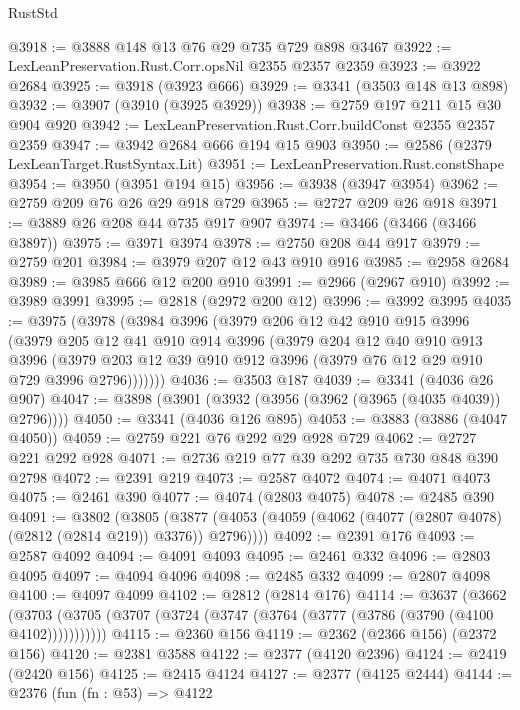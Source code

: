 \begin{lexlean}{RustStd}
\begin{coremodule}
@3918 := @3888 @148 @13 @76 @29 @735 @729 @898 @3467
@3922 := LexLeanPreservation.Rust.Corr.opsNil @2355 @2357 @2359
@3923 := @3922 @2684
@3925 := @3918 (@3923 @666)
@3929 := @3341 (@3503 @148 @13 @898)
@3932 := @3907 (@3910 (@3925 @3929))
@3938 := @2759 @197 @211 @15 @30 @904 @920
@3942 := LexLeanPreservation.Rust.Corr.buildConst @2355 @2357 @2359
@3947 := @3942 @2684 @666 @194 @15 @903
@3950 := @2586 (@2379 LexLeanTarget.RustSyntax.Lit)
@3951 := LexLeanPreservation.Rust.constShape
@3954 := @3950 (@3951 @194 @15)
@3956 := @3938 (@3947 @3954)
@3962 := @2759 @209 @76 @26 @29 @918 @729
@3965 := @2727 @209 @26 @918
@3971 := @3889 @26 @208 @44 @735 @917 @907
@3974 := @3466 (@3466 (@3466 @3897))
@3975 := @3971 @3974
@3978 := @2750 @208 @44 @917
@3979 := @2759 @201
@3984 := @3979 @207 @12 @43 @910 @916
@3985 := @2958 @2684
@3989 := @3985 @666 @12 @200 @910
@3991 := @2966 (@2967 @910)
@3992 := @3989 @3991
@3995 := @2818 (@2972 @200 @12)
@3996 := @3992 @3995
@4035 := @3975
    (@3978
      (@3984
        @3996
        (@3979
          @206
          @12
          @42
          @910
          @915
          @3996
          (@3979
            @205
            @12
            @41
            @910
            @914
            @3996
            (@3979
              @204
              @12
              @40
              @910
              @913
              @3996
              (@3979 @203 @12 @39 @910 @912 @3996 (@3979 @76 @12 @29 @910 @729 @3996 @2796)))))))
@4036 := @3503 @187
@4039 := @3341 (@4036 @26 @907)
@4047 := @3898 (@3901 (@3932 (@3956 (@3962 (@3965 (@4035 @4039)) @2796))))
@4050 := @3341 (@4036 @126 @895)
@4053 := @3883 (@3886 (@4047 @4050))
@4059 := @2759 @221 @76 @292 @29 @928 @729
@4062 := @2727 @221 @292 @928
@4071 := @2736 @219 @77 @39 @292 @735 @730 @848 @390 @2798
@4072 := @2391 @219
@4073 := @2587 @4072
@4074 := @4071 @4073
@4075 := @2461 @390
@4077 := @4074 (@2803 @4075)
@4078 := @2485 @390
@4091 := @3802
    (@3805 (@3877 (@4053 (@4059 (@4062 (@4077 (@2807 @4078) (@2812 (@2814 @219)) @3376)) @2796))))
@4092 := @2391 @176
@4093 := @2587 @4092
@4094 := @4091 @4093
@4095 := @2461 @332
@4096 := @2803 @4095
@4097 := @4094 @4096
@4098 := @2485 @332
@4099 := @2807 @4098
@4100 := @4097 @4099
@4102 := @2812 (@2814 @176)
@4114 := @3637
    (@3662 (@3703 (@3705 (@3707 (@3724 (@3747 (@3764 (@3777 (@3786 (@3790 (@4100 @4102)))))))))))
@4115 := @2360 @156
@4119 := @2362 (@2366 @156) (@2372 @156)
@4120 := @2381 @3588
@4122 := @2377 (@4120 @2396)
@4124 := @2419 (@2420 @156)
@4125 := @2415 @4124
@4127 := @2377 (@4125 @2444)
@4144 := @2376
    (fun (fn : @53) =>
    @4122

\end{coremodule}
\end{lexlean}
